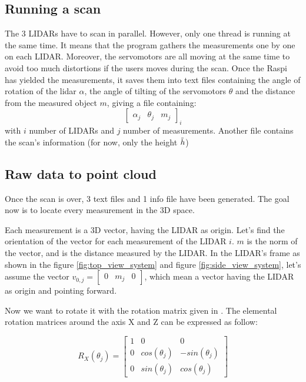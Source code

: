 \documentclass{article}
\newcommand{\vsp}{\vspace{\baselineskip}}
\begin{document}
\subsection{Running a scan}

The 3 LIDARs have to scan in parallel. However, only one thread is running at the same time. It means that the program gathers the measurements one by one on each LIDAR. Moreover, the servomotors are all moving at the same time to avoid too much distortions if the users moves during the scan. Once the Raspi has yielded the measurements, it saves them into text files containing the angle of rotation of the lidar $\alpha$, the angle of tilting of the servomotors $\theta$ and the distance from the measured object $m$, giving a file containing: 
$$ 
\begin{bmatrix}
    \alpha_{j} & \theta_{j} & m_{j} 
\end{bmatrix}_i
$$
with $i$ number of LIDARs and $j$ number of measurements. Another file contains the scan's information (for now, only the height $\Tilde{h}$) 


\subsection{Raw data to point cloud}

Once the scan is over, 3 text files and 1 info file have been generated. The goal now is to locate every measurement in the 3D space.

\vsp

Each measurement is a 3D vector, having the LIDAR as origin. Let's find the orientation of the vector for each measurement of the LIDAR $i$. $m$ is the norm of the vector, and is the distance measured by the LIDAR. In the LIDAR's frame as shown in the figure \ref{fig:top_view_system} and figure \ref{fig:side_view_system}, let's assume the vector $v_{0,j} = 
\begin{bmatrix}
0 & m_j & 0 
\end{bmatrix}$, which mean a vector having the LIDAR as origin and pointing forward.

\vsp

Now we want to rotate it with the rotation matrix given in \cite{rot_mat_euler}. The elemental rotation matrices around the axis X and Z can be expressed as follow:

\begin{equation}
\label{eq:rot_mat_x}
    R_X(\theta_j) = 
    \begin{bmatrix}
        1 & 0 & 0 \\
        0 & cos(\theta_j) & -sin(\theta_j) \\
        0 & sin(\theta_j) & cos(\theta_j)
    \end{bmatrix}
\end{equation}
\end{document}
